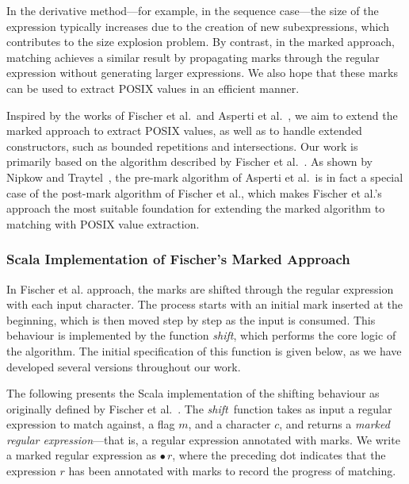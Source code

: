 \documentclass[12pt]{article}
\newcommand{\shift}{\textit{shift}}
\newcommand{\Marked}[1]{\bullet\,#1}
\begin{document}
In the derivative method—for example, in the sequence case—the size of the expression typically increases  
due to the creation of new subexpressions, which contributes to the size explosion problem.  
By contrast, in the marked approach, matching achieves a similar result by propagating marks through the regular expression  
without generating larger expressions.  
We also hope that these marks can be used to extract POSIX values in an efficient manner.  

Inspired by the works of Fischer et al.\ and Asperti et al.~\cite{Fischer2010, Asperti2010},  
we aim to extend the marked approach to extract POSIX values, as well as to handle extended constructors, such as bounded 
repetitions and intersections. Our work is primarily based on the algorithm described by Fischer et al.~\cite{Fischer2010}.  
As shown by Nipkow and Traytel~\cite{NipkowTraytel2014}, the pre-mark algorithm of Asperti et al.\ is in fact a special case of the  
post-mark algorithm of Fischer et al., which makes Fischer et al.’s approach the most suitable foundation for extending the marked  
algorithm to matching with POSIX value extraction.

\FloatBarrier
\subsubsection{Scala Implementation of Fischer’s Marked Approach}
\label{sec:scala-fischer}
In Fischer et al. approach, the marks are shifted through the regular expression with each input character. 
The process starts with an initial mark inserted at the beginning, which is then moved step by step as the input is consumed. 
This behaviour is implemented by the function \shift, which performs the core logic of the algorithm. 
The initial specification of this function is given below, as we have developed several versions throughout our work.

The following presents the Scala implementation of the shifting behaviour as originally defined by Fischer et al.~\cite{Fischer2010}.
The \shift\ function takes as input a regular expression to match against, a flag $m$, and a character $c$, and returns a \emph{marked
regular expression}—that is, a regular expression annotated with marks. We write a marked regular expression as $\bullet\,r$, where the 
preceding dot indicates that the expression $r$ has been annotated with marks to record the progress of matching.

\end{document}
